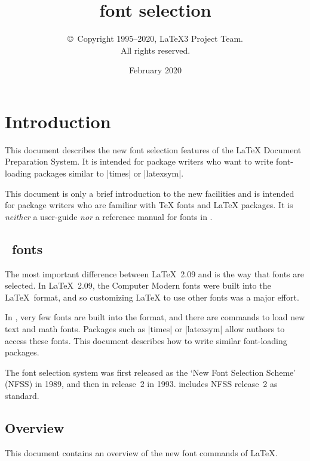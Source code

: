 \documentclass{ltxguide}[1995/11/28]
\title{\LaTeXe{} font selection}
\author{\copyright~Copyright 1995--2020, \LaTeX3 Project Team.\\
   All rights reserved.}
\date{February 2020}
\begin{document}
\maketitle

\tableofcontents

\section{Introduction}

This document describes the new font selection features of the \LaTeX{}
Document Preparation System.  It is intended for package writers who
want to write font-loading packages similar to |times| or |latexsym|.

This document is only a brief introduction to the new facilities and is
intended for package writers who are familiar with \TeX{} fonts and
\LaTeX{} packages.  It is \emph{neither} a user-guide \emph{nor} a
reference manual for fonts in \LaTeXe.

\subsection{\LaTeXe~fonts}

The most important difference between \LaTeX~2.09 and \LaTeXe{} is the
way that fonts are selected.  In \LaTeX~2.09, the Computer Modern fonts
were built into the \LaTeX~format, and so customizing \LaTeX{} to use
other fonts was a major effort.

In \LaTeXe, very few fonts are built into the format, and there are
commands to load new text and math fonts.  Packages such as |times| or
|latexsym| allow authors to access these fonts.  This document describes
how to write similar font-loading packages.

The \LaTeXe{} font selection system was first released as the `New Font
Selection Scheme' (NFSS) in 1989, and then in release~2 in 1993.
\LaTeXe{} includes NFSS release~2 as standard.

\subsection{Overview}

This document contains an overview of the new font commands of \LaTeX.
\end{document}
